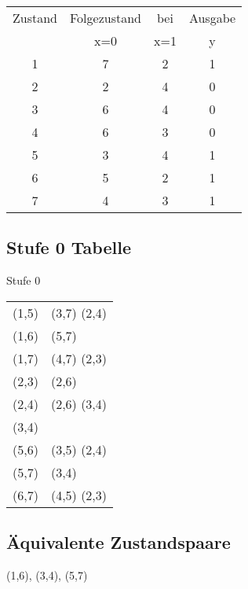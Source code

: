 \documentclass[ngerman,12pt,parskip=half]{scrartcl}
\begin{document}
\begin{tabular}{c|cc|c}  
	Zustand & Folgezustand & bei & Ausgabe \\ 	
	   & x=0 & x=1 & y  \\ \hline
	1 & 7 & 2 & 1 \\ 
	2 & 2 & 4 & 0 \\
	3 & 6 & 4 & 0 \\ 
	4 & 6 & 3 & 0 \\
	5 & 3 & 4 & 1 \\ 
	6 & 5 & 2 & 1 \\
	7 & 4 & 3 & 1 \\
\end{tabular}

\subsection{Stufe 0 Tabelle}

Stufe 0 \\
\begin{tabular}{c|l}  \hline
	(1,5) & (3,7) (2,4) \\
	(1,6) & (5,7)  \\
	(1,7) & (4,7) (2,3) \\
	(2,3) & (2,6)  \\
	(2,4) & (2,6) (3,4) \\
	(3,4) &    \\
	(5,6) & (3,5) (2,4) \\
	(5,7) & (3,4)  \\
	(6,7) & (4,5) (2,3) \\
\end{tabular}

\subsection{Äquivalente Zustandspaare}

(1,6), (3,4), (5,7)
\end{document}
